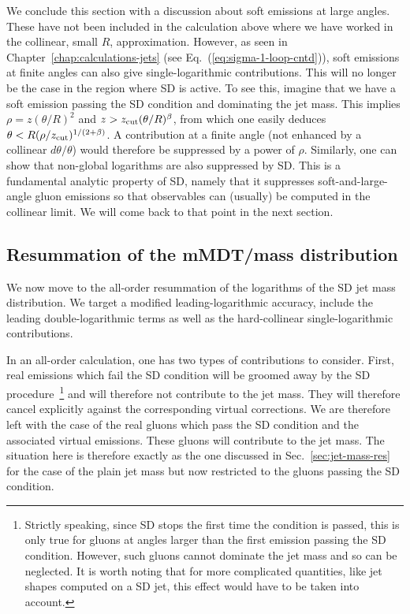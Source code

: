 We conclude this section with a discussion about soft emissions at
large angles. These have not been included in the calculation above
where we have worked in the collinear, small $R$,
approximation. However, as seen in
Chapter~\ref{chap:calculations-jets} (see \eg
Eq.~(\ref{eq:sigma-1-loop-cntd})), soft emissions at finite angles can
also give single-logarithmic contributions.
%
This will no longer be the case in the region where SD is
active. To see this, imagine that we have a soft emission passing the
SD condition and dominating the jet mass. This implies
$\rho=z(\theta/R)^2$ and $z>z_{\text{cut}} (\theta/R)^\beta$, from which one
easily deduces $\theta<R (\rho/z_{\text{cut}})^{1/(2+\beta)}$. A contribution
at a finite angle (\ie not enhanced by a collinear $d\theta/\theta$)
would therefore be suppressed by a power of $\rho$.
%
Similarly, one can show that non-global logarithms are also suppressed
by SD.
%
This is a fundamental analytic property of SD, namely that it
suppresses soft-and-large-angle gluon emissions so that observables can
(usually) be computed in the collinear limit. We will come back to
that point in the next section.

\subsection{Resummation of the mMDT/\SD mass distribution}\label{sec:calc-groomed-mass-LL}


We now move to the all-order resummation of the logarithms of the SD
jet mass distribution. We target a modified leading-logarithmic
accuracy, \ie include the leading double-logarithmic terms as well as
the hard-collinear single-logarithmic contributions.

In an all-order calculation, one has two types of contributions to
consider. First, real emissions which fail the SD condition will be
groomed away by the SD procedure~\footnote{Strictly speaking, since SD
  stops the first time the condition is passed, this is only true for
  gluons at angles larger than the first emission passing the SD
  condition. However, such gluons cannot dominate the jet mass and so
  can be neglected. It is worth noting that for more complicated
  quantities, like jet shapes computed on a SD jet, this effect would
  have to be taken into account.}  and will therefore not contribute
to the jet mass. They will therefore cancel explicitly against the
corresponding virtual corrections.
%
We are therefore left with the case of the real gluons which pass the
SD condition and the associated virtual emissions. These gluons
will contribute to the jet mass.
%
The situation here is therefore exactly as the one discussed in
Sec.~\ref{sec:jet-mass-res} for the case of the plain jet mass but
now restricted to the gluons passing the SD condition.


